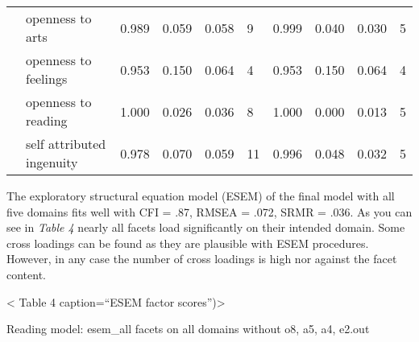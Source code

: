 \documentclass[,man,floatsintext]{apa6}
\theoremstyle{definition}
\theoremstyle{definition}
\theoremstyle{definition}
\theoremstyle{remark}
\begin{document}
\begin{table}[H]
{\begin{tabular}{llllllllll}
 & openness to arts & 0.989 & 0.059 & 0.058 & 9 & 0.999 & 0.040 & 0.030 & 5\\
 & openness to feelings & 0.953 & 0.150 & 0.064 & 4 & 0.953 & 0.150 & 0.064 & 4\\
 & openness to reading & 1.000 & 0.026 & 0.036 & 8 & 1.000 & 0.000 & 0.013 & 5\\
 & self attributed ingenuity & 0.978 & 0.070 & 0.059 & 11 & 0.996 & 0.048 & 0.032 & 5\\
\bottomrule
\end{tabular}}
\end{table}

The exploratory structural equation model (ESEM) of the final model with
all five domains fits well with CFI = .87, RMSEA = .072, SRMR = .036. As
you can see in \emph{Table 4} nearly all facets load significantly on
their intended domain. Some cross loadings can be found as they are
plausible with ESEM procedures. However, in any case the number of cross
loadings is high nor against the facet content.

\textless{} Table 4 caption=\enquote{ESEM factor scores})\textgreater{}

Reading model: esem\_all facets on all domains without o8, a5, a4,
e2.out
\end{document}
